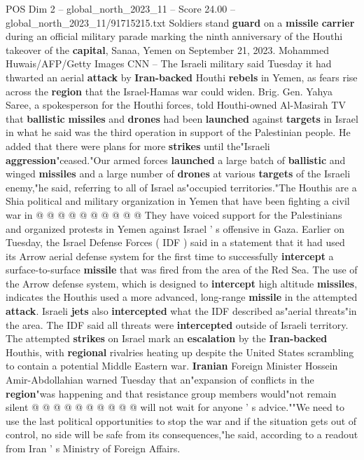 \begin{textsample}{POS Dim 2 – global\_north\_2023\_11 – Score 24.00 – global\_north\_2023\_11/91715215.txt}  \label{ex:f2_pos_304}
Soldiers stand \textbf{guard} on a \textbf{missile} \textbf{carrier} during an official military parade marking the ninth anniversary of the Houthi takeover of the \textbf{capital}, Sanaa, Yemen on September 21, 2023.
Mohammed Huwais/AFP/Getty Images CNN -- The Israeli military said Tuesday it had thwarted an aerial \textbf{attack} by \textbf{Iran-backed} Houthi \textbf{rebels} in Yemen, as fears rise across the \textbf{region} that the Israel-Hamas war could widen.
Brig.
Gen.
Yahya Saree, a spokesperson for the Houthi forces, told Houthi-owned Al-Masirah TV that \textbf{ballistic} \textbf{missiles} and \textbf{drones} had been \textbf{launched} against \textbf{targets} in Israel in what he said was the third operation in support of the Palestinian people.
He added that there were plans for more \textbf{strikes} until the"Israeli \textbf{aggression}"ceased."Our armed forces \textbf{launched} a large batch of \textbf{ballistic} and winged \textbf{missiles} and a large number of \textbf{drones} at various \textbf{targets} of the Israeli enemy,"he said, referring to all of Israel as"occupied territories."The Houthis are a Shia political and military organization in Yemen that have been fighting a civil war in @ @ @ @ @ @ @ @ @ @ They have voiced support for the Palestinians and organized protests in Yemen against Israel ' s offensive in Gaza.
Earlier on Tuesday, the Israel Defense Forces ( IDF ) said in a statement that it had used its Arrow aerial defense system for the first time to successfully \textbf{intercept} a surface-to-surface \textbf{missile} that was fired from the area of the Red Sea.
The use of the Arrow defense system, which is designed to \textbf{intercept} high altitude \textbf{missiles}, indicates the Houthis used a more advanced, long-range \textbf{missile} in the attempted \textbf{attack}.
Israeli \textbf{jets} also \textbf{intercepted} what the IDF described as"aerial threats"in the area.
The IDF said all threats were \textbf{intercepted} outside of Israeli territory.
The attempted \textbf{strikes} on Israel mark an \textbf{escalation} by the \textbf{Iran-backed} Houthis, with \textbf{regional} rivalries heating up despite the United States scrambling to contain a potential Middle Eastern war. \textbf{Iranian} Foreign Minister Hossein Amir-Abdollahian warned Tuesday that an"expansion of conflicts in the \textbf{region}"was happening and that resistance group members would"not remain silent @ @ @ @ @ @ @ @ @ @ will not wait for anyone ' s advice.""We need to use the last political opportunities to stop the war and if the situation gets out of control, no side will be safe from its consequences,"he said, according to a readout from Iran ' s Ministry of Foreign Affairs.

\end{textsample}
